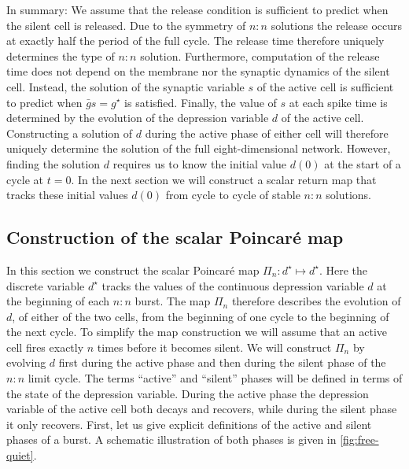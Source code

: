 \documentclass[utf8]{frontiersFPHY} %
\begin{document}
In summary: We assume that the release condition is sufficient to predict when the silent cell is released.
Due to the symmetry of $n:n$ solutions the release occurs at exactly half the period of the full cycle.
The release time therefore uniquely determines the type of $n:n$ solution.
Furthermore, computation of the release time does not depend on the membrane nor the synaptic dynamics of the silent cell.
Instead, the solution of the synaptic variable $s$ of the active cell is sufficient to predict when $\bar g s =g^{\star}$ is satisfied.
Finally, the value of $s$ at each spike time is determined by the evolution of the depression variable $d$ of the active cell.
Constructing a solution of $d$ during the active phase of either cell will therefore uniquely determine the solution of the full eight-dimensional network.
However, finding the solution $d$ requires us to know the initial value $d(0)$ at the start of a cycle at $t=0$.
In the next section we will construct a scalar return map that tracks these initial values $d(0)$ from cycle to cycle of stable $n:n$ solutions.

\subsection{Construction of the scalar Poincaré map}
In this section we construct the scalar Poincaré map $\Pi_n:d^{\star}\mapsto d^{\star}$.
Here the discrete variable $d^{\star}$ tracks the values of the continuous depression variable $d$ at the beginning of each $n:n$ burst.
The map $\Pi_{n}$ therefore describes the evolution of $d$, of either of the two cells, from the beginning of one cycle to the beginning of the next cycle.
To simplify the map construction we will assume that an active cell fires exactly $n$ times before it becomes silent.
We will construct $\Pi_n$ by evolving $d$ first during the active phase and then during the silent phase of the $n:n$ limit cycle.
The terms ``active'' and ``silent'' phases will be defined in terms of the state of the depression variable.
During the active phase the depression variable of the active cell both decays and recovers, while during the silent phase it only recovers.
First, let us give explicit definitions of the active and silent phases of a burst.
A schematic illustration of both phases is given in \cref{fig:free-quiet}.
\end{document}
